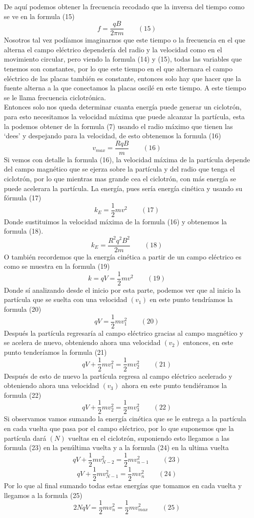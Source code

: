 \documentclass[12pt]{article}
\begin{document}
			De aquí podemos obtener la frecuencia recodado que la inversa del tiempo como se ve en la formula (15)
			$$ f = \frac{qB}{2\pi m} \qquad (15) $$
			Nosotros tal vez podíamos imaginarnos que este tiempo o la frecuencia en el que alterna el campo eléctrico dependería del radio y la velocidad 
			como en el movimiento circular, pero viendo la formula (14) y (15), todas las variables que tenemos son constantes, por lo que este 
			tiempo en el que alternara el campo eléctrico de las placas también es constante, entonces solo hay que hacer que la fuente 
			alterna a la que conectamos la placas oscilé en este tiempo. A este tiempo se le llama frecuencia ciclotrónica.\\
			Entonces solo nos queda determinar cuanta energía puede generar un ciclotrón, para esto necesitamos la velocidad máxima que 
			puede alcanzar la partícula, esta la podemos obtener de la formula (7) usando el radio máximo que tienen las ‘dees’ y despejando 
			para la velocidad, de esto obtenemos la formula (16)
			$$ v_{max} = \frac{RqB}{m} \qquad (16) $$
			Si vemos con detalle la formula (16), la velocidad máxima de la partícula depende del campo magnético que se ejerza sobre la 
			partícula y del radio que tenga el ciclotrón, por lo que mientras mas grande cea el ciclotrón, con más energía se puede 
			acelerara la partícula. La energía, pues sería energía cinética y usando su fórmula (17)
			$$ k_E = \frac{1}{2}mv^2 \qquad (17) $$
			Donde sustituimos la velocidad máxima de la formula (16) y obtenemos la formula (18).
			$$ k_E = \frac{R^2q^2B^2}{2m} \qquad (18) $$
			O también recordemos que la energía cinética a partir de un campo eléctrico es como se muestra en la formula (19)
			$$ k = qV = \frac{1}{2}mv^2 \qquad (19) $$
			Donde sí analizando desde el inicio por esta parte, podemos ver que al inicio la partícula que se suelta con una velocidad $ (v_1) $ 
			en este punto tendríamos la formula (20)
			$$ qV = \frac{1}{2}mv_1^2 \qquad (20)$$
			Después la partícula regresaría al campo eléctrico gracias al campo magnético y se acelera de nuevo, obteniendo ahora una velocidad 
			$ (v_2) $ entonces, en este punto tenderíamos la formula (21)
			$$ qV + \frac{1}{2}mv_1^2 =  \frac{1}{2}mv_2^2 \qquad (21) $$
			Después de esto de nuevo la partícula regresa al campo eléctrico acelerado y obteniendo ahora una velocidad $ (v_3) $ ahora en este 
			punto tendiéramos la formula (22)
			$$ qV + \frac{1}{2}mv_2^2 =  \frac{1}{2}mv_3^2 \qquad (22) $$
			Si observamos vamos sumando la energía cinética que se le entrega a la partícula en cada vuelta que pasa por el campo eléctrico, 
			por lo que suponemos que la partícula dará $ (N) $ vueltas en el ciclotrón, suponiendo esto llegamos a las formula (23) en la 
			penúltima vuelta y a la formula (24) en la ultima vuelta
			$$ qV + \frac{1}{2}mv_{N-2}^2 =  \frac{1}{2}mv_{n-1}^2 \qquad (23) $$
			$$ qV + \frac{1}{2}mv_{N-1}^2 =  \frac{1}{2}mv_{n}^2 \qquad (24) $$
			Por lo que al final sumando todas estas energías que tomamos en cada vuelta y llegamos a la formula (25)
			$$ 2NqV  =  \frac{1}{2}mv_{n}^2 = \frac{1}{2}mv_{max}^2 \qquad (25) $$
\end{document}

